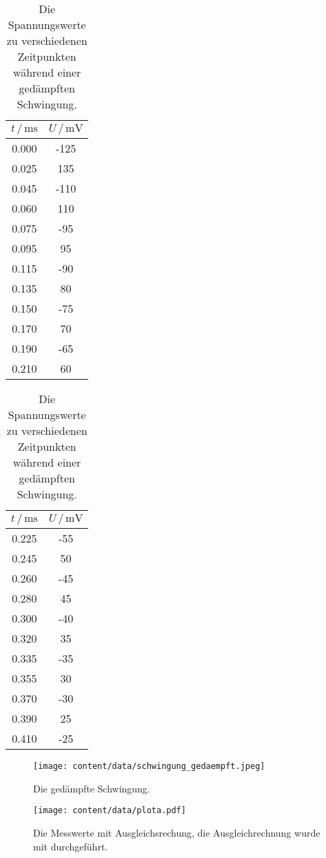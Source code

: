 \begin{table}
\centering
\caption{Die Spannungswerte zu verschiedenen Zeitpunkten während einer gedämpften Schwingung.}
\begin{tabular}[t]{cc}
    \toprule
    $t \, / \, \si{\milli\s}$ & $U \,/\, \si{\milli\V}$ \\
    \midrule
    0.000&-125\\
    0.025&135\\
    0.045&-110\\    
    0.060&110\\
    0.075&-95\\
    0.095&95\\
    0.115&-90\\
    0.135&80\\
    0.150&-75\\
    0.170&70\\
    0.190&-65\\
    0.210&60\\
\end{tabular}
\begin{tabular}[t]{cc}
    \toprule
    $t \, / \, \si{\milli\s}$ & $U \,/\, \si{\milli\V}$ \\
    \midrule
    0.225&-55\\
    0.245&50\\
    0.260&-45\\
    0.280&45\\
    0.300&-40\\
    0.320&35\\
    0.335&-35\\
    0.355&30\\
    0.370&-30\\
    0.390&25\\
    0.410&-25\\
    \bottomrule
\end{tabular}
\label{tab:gedaempft}
\end{table}

\begin{figure}
\centering
\caption{Die gedämpfte Schwingung.}
\texttt{[image: content/data/schwingung\_gedaempft.jpeg]}
\label{fig:schwingung}
\end{figure}


\begin{figure}
\centering
\caption{Die Messwerte mit Ausgleichsrechung, die Ausgleichrechnung wurde mit \cite{matplotlib} durchgeführt.}
\texttt{[image: content/data/plota.pdf]}
\label{fig:ausgleich}
\end{figure}

